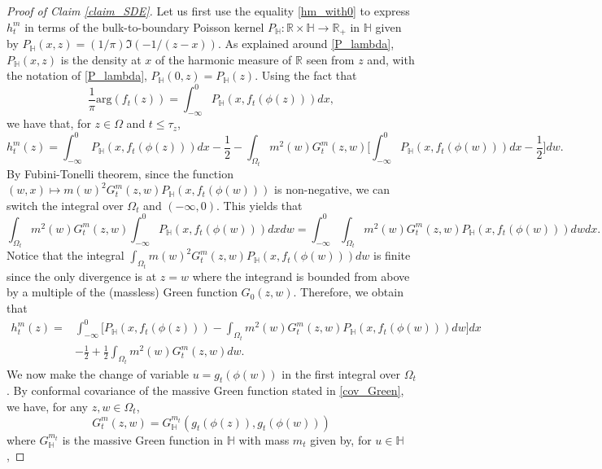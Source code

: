 \documentclass{article}
\newcommand{\HH}{{\mathbb{H}}}
\theoremstyle{definition}
\theoremstyle{remark}
\theoremstyle{remark}
\begin{document}
\begin{proof}[Proof of Claim \ref{claim_SDE}]
Let us first use the equality \eqref{hm_with0} to express $h_t^m$ in terms of the bulk-to-boundary Poisson kernel $P_{\HH}: \mathbb{R} \times \HH \to \mathbb{R}_{+}$ in $\HH$ given by $P_{\HH}(x,z) = (1/\pi)\Im(-1/(z-x))$. As explained around \eqref{P_lambda}, $P_{\HH}(x,z)$ is the density at $x$ of the harmonic measure of $\mathbb{R}$ seen from $z$ and, with the notation of \eqref{P_lambda}, $P_{\HH}(0,z) = P_{\HH}(z)$. Using the fact that
\begin{equation*}
    \frac{1}{\pi} \text{arg}(f_t(z)) = \int_{-\infty}^{0} P_{\HH}(x, f_t(\phi(z))) dx,
\end{equation*}
we have that, for $z \in \Omega$ and $t \leq \tau_z$,
\begin{equation*}
    h_t^m(z) = \int_{-\infty}^{0} P_{\mathbb{H}} (x, f_t(\phi(z))) dx -\frac{1}{2} - \int_{\Omega_t} m^2(w) G_t^m(z,w) \bigg[ \int_{-\infty}^{0} P_{\mathbb{H}} (x, f_t(\phi(w))) dx - \frac{1}{2} \bigg] dw.
\end{equation*}
By Fubini-Tonelli theorem, since the function $(w,x) \mapsto m(w)^2 G_t^m(z,w) P_{\HH}(x,f_t(\phi(w)))$ is non-negative, we can switch the integral over $\Omega_t$ and $(-\infty, 0)$. This yields that
\begin{equation*}
    \int_{\Omega_t} m^2(w) G_t^m(z,w)  \int_{-\infty}^{0} P_{\mathbb{H}} (x, f_t(\phi(w))) dx dw = \int_{-\infty}^{0} \int_{\Omega_t} m^2(w) G_t^m(z,w) P_{\HH}(x,f_t(\phi(w))) dw dx.
\end{equation*}
Notice that the integral $\int_{\Omega_t}m(w)^2 G_t^m(z,w) P_{\HH}(x,f_t(\phi(w))) dw$ is finite since the only divergence is at $z=w$ where the integrand is bounded from above by a multiple of the (massless) Green function $G_{0}(z,w)$. Therefore, we obtain that
\begin{align}
    h_t^m(z) = &\int_{-\infty}^{0} \bigg[ P_{\HH}(x,f_t(\phi(z))) - \int_{\Omega_t}m^2(w)G_t^m(z,w) P_{\HH}(x,f_t(\phi(w))) dw \bigg] dx \label{hm_P_var}\\
    & -\frac{1}{2} + \frac{1}{2} \int_{\Omega_t} m^2(w) G_t^m(z,w) dw.
\end{align}
We now make the change of variable $u = g_t(\phi(w))$ in the first integral over $\Omega_t$. By conformal covariance of the massive Green function stated in \eqref{cov_Green}, we have, for any $z, w \in \Omega_t$,
\begin{equation*}
    G_t^m(z,w) = G_{\HH}^{m_t}(g_t(\phi(z)), g_t(\phi(w)))
\end{equation*}
where $G_{\HH}^{m_t}$ is the massive Green function in $\HH$ with mass $m_t$ given by, for $u \in \HH$,

\end{proof}
\end{document}

